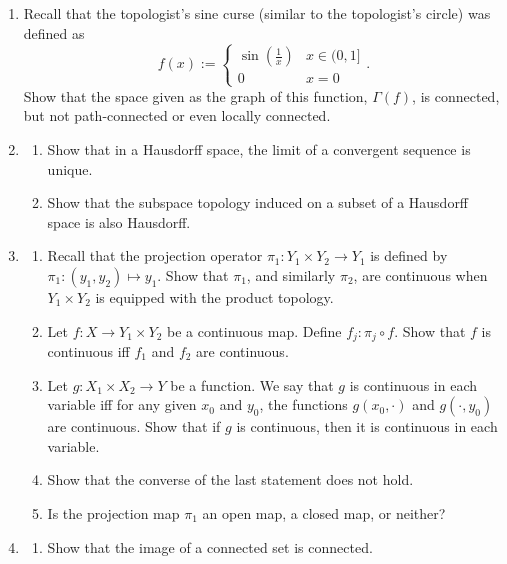 \documentclass[notoc,notitlepage]{tufte-book}
\begin{document}
\begin{enumerate}
  \item Recall that the topologist's sine curse (similar to the topologist's circle)
    was defined as
    \begin{equation*}
      f(x) := \begin{cases}
        \sin \left( \frac{1}{x} \right) & x \in (0, 1] \\
        0                               & x = 0
      \end{cases}.
    \end{equation*}
    Show that the space given as the graph of this function, $\Gamma(f)$, is connected,
    but not path-connected or even locally connected.
  \item 
    \begin{enumerate}
      \item Show that in a Hausdorff space, the limit of a convergent sequence is unique.
      \item Show that the subspace topology induced on a subset of a Hausdorff space is
        also Hausdorff.
    \end{enumerate}
  \item
    \begin{enumerate}
      \item Recall that the projection operator $\pi_1 : Y_1 \times Y_2 \to Y_1$ is defined
        by $\pi_1 : (y_1, y_2) \mapsto y_1$. Show that $\pi_1$, and similarly $\pi_2$, are
        continuous when $Y_1 \times Y_2$ is equipped with the product topology.
      \item Let $f : X \to Y_1 \times Y_2$ be a continuous map. Define $f_j : \pi_j \circ f$.
        Show that $f$ is continuous iff $f_1$ and $f_2$ are continuous.
      \item Let $g : X_1 \times X_2 \to Y$ be a function. We say that $g$ is continuous in
        each variable iff for any given $x_0$ and $y_0$, the functions $g(x_0, \cdot)$ and
        $g(\cdot, y_0)$ are continuous. Show that if $g$ is continuous, then it is continuous
        in each variable.
      \item Show that the converse of the last statement does not hold.
      \item Is the projection map $\pi_1$ an open map, a closed map, or neither?
    \end{enumerate}
  \item
    \begin{enumerate}
      \item Show that the image of a connected set is connected.

\end{enumerate}
\end{enumerate}
\end{document}
